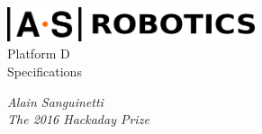 \begin{titlepage}
    \begin{flushleft}
        {\sfb
            \includegraphics[height=1cm]{img/text} \\[7cm]

            {\huge Platform D}\\[.5cm]
            {\LARGE Specifications }\\[.5cm]
            
            
        }
        
        
        \vfill
        \emph{Alain Sanguinetti}\\
        \emph{The 2016 Hackaday Prize}
    \end{flushleft}
\end{titlepage}